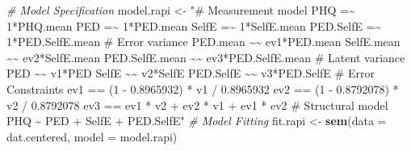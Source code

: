 \documentclass[
  man]{apa7}
\newenvironment{Shaded}{\begin{snugshade}}{\end{snugshade}}
\newcommand{\AttributeTok}[1]{\textcolor[rgb]{0.13,0.29,0.53}{#1}}
\newcommand{\CommentTok}[1]{\textcolor[rgb]{0.56,0.35,0.01}{\textit{#1}}}
\newcommand{\FunctionTok}[1]{\textcolor[rgb]{0.13,0.29,0.53}{\textbf{#1}}}
\newcommand{\NormalTok}[1]{#1}
\newcommand{\OtherTok}[1]{\textcolor[rgb]{0.56,0.35,0.01}{#1}}
\newcommand{\StringTok}[1]{\textcolor[rgb]{0.31,0.60,0.02}{#1}}
\begin{document}
\begin{Shaded}
\begin{Highlighting}[]
\CommentTok{\# Model Specification}
\NormalTok{model.rapi }\OtherTok{\textless{}{-}} \StringTok{"\# Measurement model}
\StringTok{                 PHQ =\textasciitilde{} 1*PHQ.mean}
\StringTok{                 PED =\textasciitilde{} 1*PED.mean}
\StringTok{                 SelfE =\textasciitilde{} 1*SelfE.mean}
\StringTok{                 PED.SelfE =\textasciitilde{} 1*PED.SelfE.mean}
\StringTok{               \# Error variance}
\StringTok{                 PED.mean \textasciitilde{}\textasciitilde{} ev1*PED.mean}
\StringTok{                 SelfE.mean \textasciitilde{}\textasciitilde{} ev2*SelfE.mean}
\StringTok{                 PED.SelfE.mean \textasciitilde{}\textasciitilde{} ev3*PED.SelfE.mean}
\StringTok{               \# Latent variance}
\StringTok{                 PED \textasciitilde{}\textasciitilde{} v1*PED}
\StringTok{                 SelfE \textasciitilde{}\textasciitilde{} v2*SelfE}
\StringTok{                 PED.SelfE \textasciitilde{}\textasciitilde{} v3*PED.SelfE}
\StringTok{               \# Error Constraints}
\StringTok{                 ev1 == (1 {-} 0.8965932) * v1 / 0.8965932}
\StringTok{                 ev2 == (1 {-} 0.8792078) * v2 / 0.8792078}
\StringTok{                 ev3 == ev1 * v2 + ev2 * v1 + ev1 * ev2}
\StringTok{               \# Structural model}
\StringTok{                 PHQ \textasciitilde{} PED + SelfE + PED.SelfE"}
\CommentTok{\# Model Fitting}
\NormalTok{fit.rapi }\OtherTok{\textless{}{-}} \FunctionTok{sem}\NormalTok{(}\AttributeTok{data =}\NormalTok{ dat.centered, }\AttributeTok{model =}\NormalTok{ model.rapi)}
\end{Highlighting}
\end{Shaded}

\normalsize
\end{document}

